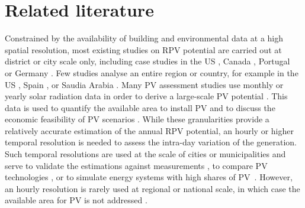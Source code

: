 \section{Related literature}
\label{solar_literature}
Constrained by the availability of building and environmental data at a high spatial resolution, most existing studies on RPV potential are carried out at district or city scale only, including case studies in the US \cite{levinson_solar_2009}, Canada \cite{nguyen_incorporating_2012}, Portugal~\cite{santos_applications_2014} or Germany \cite{strzalka_large_2012}. 
Few studies analyse an entire region or country, for example in the US \cite{phillips_data_2019, kodysh_methodology_2013}, Spain \cite{schallenberg-rodriguez_photovoltaic_2013}, or Saudia Arabia \cite{khan_rooftop_2017}. 
%
Many PV assessment studies use monthly or yearly solar radiation data in order to derive a large-scale PV potential \cite{ordonez_analysis_2010}. This data is used to quantify the available area to install PV \cite{mansouri_kouhestani_evaluating_2019} and to discuss the economic feasibility of PV scenarios \cite{romero_rodriguez_assessment_2017}.
While these granularities provide a relatively accurate estimation of the annual RPV potential, an hourly or higher temporal resolution is needed to assess the intra-day variation of the generation. Such temporal resolutions are used at the scale of cities or municipalities \cite{hong_development_2017, singh_estimation_2015} and serve to validate the estimations against measurements \cite{jakubiec_method_2013}, to compare PV technologies \cite{lukac_buildings_2014}, or to simulate energy systems with high shares of PV~\cite{wegertseder_combining_2016}. However, an hourly resolution is rarely used at regional or national scale, in which case the available area for PV is not addressed \cite{buffat_scalable_2018}.

